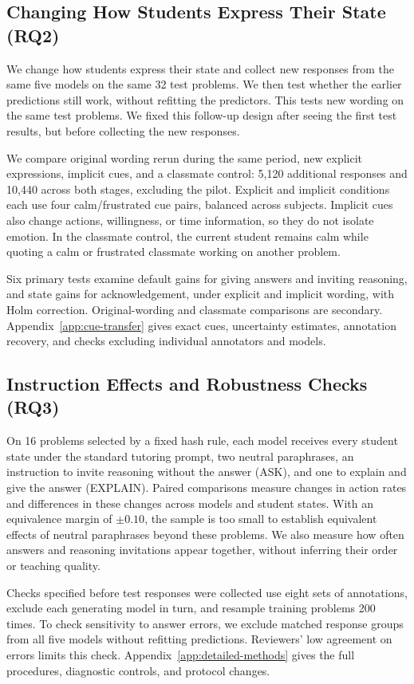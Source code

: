 \subsection{Changing How Students Express Their State (RQ2)}
\label{sec:cue-design}
We change how students express their state and collect new responses from the
same five models on the same 32 test problems. We then test whether the earlier
predictions still work, without refitting the predictors. This tests new wording
on the same test problems. We fixed this follow-up design after seeing the
first test results, but before collecting the new responses.

We compare original wording rerun during the same period, new explicit
expressions, implicit cues, and a classmate control: 5,120 additional responses
and 10,440 across both stages, excluding the pilot. Explicit and implicit
conditions each use four calm/frustrated cue pairs, balanced across subjects.
Implicit cues also change actions, willingness, or time information, so they
do not isolate emotion. In the classmate control, the current student remains
calm while quoting a calm or frustrated classmate working on another problem.

Six primary tests examine default gains for giving answers and inviting
reasoning, and state gains for acknowledgement, under explicit and implicit
wording, with Holm correction. Original-wording and classmate comparisons
are secondary.
Appendix~\ref{app:cue-transfer} gives exact cues, uncertainty estimates,
annotation recovery, and checks excluding individual annotators and models.

\subsection{Instruction Effects and Robustness Checks (RQ3)}
On 16 problems selected by a fixed hash rule, each model receives every student
state under the standard tutoring prompt, two neutral paraphrases, an
instruction to invite reasoning without the answer (ASK), and one to explain
and give the answer (EXPLAIN). Paired comparisons measure changes in action
rates and differences in these changes across models and student states.
With an equivalence margin of $\pm0.10$, the sample is too small to establish
equivalent effects of neutral paraphrases beyond these problems. We also
measure how often answers and reasoning invitations appear together, without
inferring their order or teaching quality.

Checks specified before test responses were collected use eight sets of
annotations, exclude each generating model in turn, and resample training
problems 200 times. To check sensitivity to answer errors, we exclude matched
response groups from all five models without refitting predictions. Reviewers'
low agreement on errors limits this check. Appendix~\ref{app:detailed-methods}
gives the full procedures, diagnostic controls, and protocol changes.

